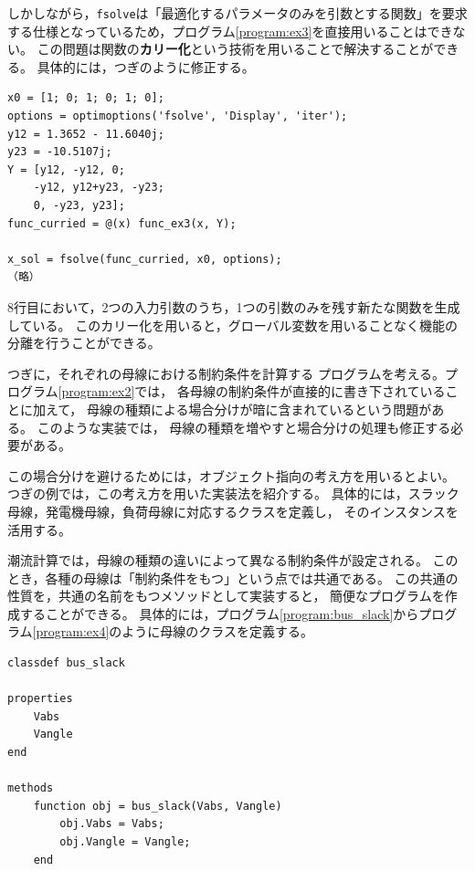 \documentclass[tombow,dvipdfmx]{corona-a5-1.1}
\begin{document}
{\begin{例}[アドミタンス行列の実装の分離]
しかしながら，\verb|fsolve|は「最適化するパラメータのみを引数とする関数」を要求する仕様となっているため，プログラム\ref{program:ex3}を直接用いることはできない。
この問題は関数の\textbf{カリー化}という技術を用いることで解決することができる。
具体的には，つぎのように修正する。

\smallskip
\begin{PROGRAMA}[count,title={main\_ex3.m}]\label{program:ex3_main}
\begin{verbatim}
x0 = [1; 0; 1; 0; 1; 0];
options = optimoptions('fsolve', 'Display', 'iter');
y12 = 1.3652 - 11.6040j;
y23 = -10.5107j;
Y = [y12, -y12, 0;
    -y12, y12+y23, -y23;
    0, -y23, y23];
func_curried = @(x) func_ex3(x, Y);

x_sol = fsolve(func_curried, x0, options);
（略）
\end{verbatim}
\end{PROGRAMA}

8行目において，2つの入力引数のうち，1つの引数のみを残す新たな関数を生成している。
このカリー化を用いると，グローバル変数を用いることなく機能の分離を行うことができる。
\end{例}

つぎに，それぞれの母線における制約条件を計算する
プログラムを考える。プログラム\ref{program:ex2}では，
各母線の制約条件が直接的に書き下されていることに加えて，
母線の種類による場合分けが暗に含まれているという問題がある。
このような実装では，
母線の種類を増やすと場合分けの処理も修正する必要がある。

この場合分けを避けるためには，オブジェクト指向の考え方を用いるとよい。
つぎの例では，この考え方を用いた実装法を紹介する。
具体的には，スラック母線，発電機母線，負荷母線に対応するクラスを定義し，
そのインスタンスを活用する。

\begin{例}[母線の実装の分離]
潮流計算では，母線の種類の違いによって異なる制約条件が設定される。
このとき，各種の母線は「制約条件をもつ」という点では共通である。
この共通の性質を，共通の名前をもつメソッドとして実装すると，
簡便なプログラムを作成することができる。
具体的には，プログラム\ref{program:bus_slack}からプログラム\ref{program:ex4}のように母線のクラスを定義する。

\smallskip
\begin{PROGRAMA}[count,title={bus\_slack.m}]\label{program:bus_slack}
\begin{verbatim}
classdef bus_slack

properties
    Vabs
    Vangle
end

methods
    function obj = bus_slack(Vabs, Vangle)
        obj.Vabs = Vabs;
        obj.Vangle = Vangle;
    end
    

\end{verbatim}
\end{PROGRAMA}
\end{例}}
\end{document}
